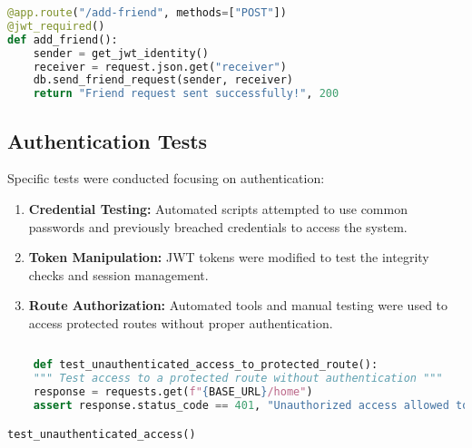 \documentclass{article}
\begin{document}
\begin{lstlisting}[language=Python]
@app.route("/add-friend", methods=["POST"])
@jwt_required()
def add_friend():
    sender = get_jwt_identity()
    receiver = request.json.get("receiver")
    db.send_friend_request(sender, receiver)
    return "Friend request sent successfully!", 200
\end{lstlisting}

\subsection*{Authentication Tests}
Specific tests were conducted focusing on authentication:

\begin{enumerate}
    \item \textbf{Credential Testing:} Automated scripts attempted to use common passwords and previously breached credentials to access the system.
    \item \textbf{Token Manipulation:} JWT tokens were modified to test the integrity checks and session management.
    \item \textbf{Route Authorization:} Automated tools and manual testing were used to access protected routes without proper authentication.
\end{enumerate}

\begin{lstlisting}[language=Python]
    
    def test_unauthenticated_access_to_protected_route():
    """ Test access to a protected route without authentication """
    response = requests.get(f"{BASE_URL}/home")
    assert response.status_code == 401, "Unauthorized access allowed to home"

test_unauthenticated_access()
\end{lstlisting}
\end{document}
